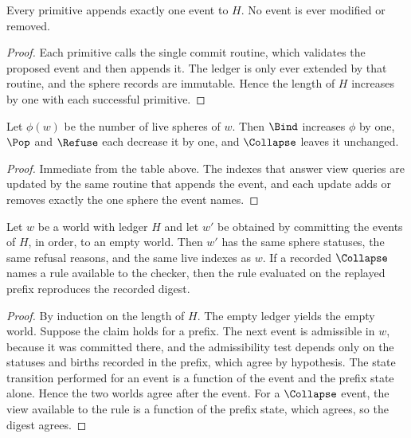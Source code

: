 \begin{proposition}\label{prop:grow}
Every primitive appends exactly one event to $H$. No event is ever modified or removed.
\end{proposition}

\begin{proof}
Each primitive calls the single commit routine, which validates the proposed event and then appends it. The ledger is only ever extended by that routine, and the sphere records are immutable. Hence the length of $H$ increases by one with each successful primitive.
\end{proof}

\begin{proposition}\label{prop:live}
Let $\phi(w)$ be the number of live spheres of $w$. Then $\Bind$ increases $\phi$ by one, $\Pop$ and $\Refuse$ each decrease it by one, and $\Collapse$ leaves it unchanged.
\end{proposition}

\begin{proof}
Immediate from the table above. The indexes that answer view queries are updated by the same routine that appends the event, and each update adds or removes exactly the one sphere the event names.
\end{proof}

\begin{proposition}\label{prop:replay}
Let $w$ be a world with ledger $H$ and let $w'$ be obtained by committing the events of $H$, in order, to an empty world. Then $w'$ has the same sphere statuses, the same refusal reasons, and the same live indexes as $w$. If a recorded $\Collapse$ names a rule available to the checker, then the rule evaluated on the replayed prefix reproduces the recorded digest.
\end{proposition}

\begin{proof}
By induction on the length of $H$. The empty ledger yields the empty world. Suppose the claim holds for a prefix. The next event is admissible in $w$, because it was committed there, and the admissibility test depends only on the statuses and births recorded in the prefix, which agree by hypothesis. The state transition performed for an event is a function of the event and the prefix state alone. Hence the two worlds agree after the event. For a $\Collapse$ event, the view available to the rule is a function of the prefix state, which agrees, so the digest agrees.
\end{proof}

